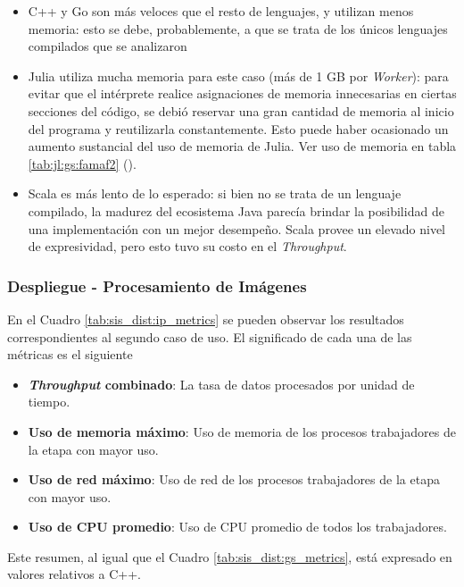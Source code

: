 \documentclass[11pt]{article}
\let\Oldsubsubsection\subsubsection
\renewcommand{\subsubsection}{\FloatBarrier\Oldsubsubsection}
\newcommand{\english}[1]{\textit{#1}}
\begin{document}
\begin{itemize}
    \item C++ y Go son más veloces que el resto de lenguajes, y utilizan menos memoria: esto se debe, probablemente, a que se trata de los únicos lenguajes compilados que se analizaron
    \item Julia utiliza mucha memoria para este caso (más de 1 GB por \english{Worker}): para evitar que el intérprete realice asignaciones de memoria innecesarias en ciertas secciones del código, se debió reservar una gran cantidad de memoria al inicio del programa y reutilizarla constantemente. Esto puede haber ocasionado un aumento sustancial del uso de memoria de Julia. Ver uso de memoria en tabla \ref{tab:jl:gs:famaf2} ().
    \item Scala es más lento de lo esperado: si bien no se trata de un lenguaje compilado, la madurez del ecosistema Java parecía brindar la posibilidad de una implementación con un mejor desempeño. Scala provee un elevado nivel de expresividad, pero esto tuvo su costo en el \english{Throughput}.
\end{itemize}

\subsubsection{Despliegue - Procesamiento de Imágenes}

En el Cuadro \ref{tab:sis_dist:ip_metrics} se pueden observar los resultados correspondientes al segundo caso de uso. El significado de cada una de las métricas es el siguiente

\begin{itemize}
    \item \textbf{\english{Throughput} combinado}: La tasa de datos procesados por unidad de tiempo.
    \item \textbf{Uso de memoria máximo}: Uso de memoria de los procesos trabajadores de la etapa con mayor uso.
    \item \textbf{Uso de red máximo}: Uso de red de los procesos trabajadores de la etapa con mayor uso.
    \item \textbf{Uso de CPU promedio}: Uso de CPU promedio de todos los trabajadores.
\end{itemize}

Este resumen, al igual que el Cuadro \ref{tab:sis_dist:gs_metrics}, está expresado en valores relativos a C++.
\end{document}
